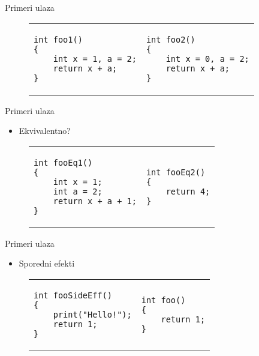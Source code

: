 \begin{frame}[fragile]{Primeri ulaza}
\begin{figure}[!h]
\centering
\begin{tabular}{ p{4.5cm} p{4.5cm} }
\begin{lstlisting}
int foo1()
{
    int x = 1, a = 2;
    return x + a;
}
\end{lstlisting}
&
\begin{lstlisting}
int foo2()
{
    int x = 0, a = 2;
    return x + a;
}
\end{lstlisting}
\end{tabular}
\end{figure}
\end{frame}


\begin{frame}[fragile]{Primeri ulaza}
    \begin{itemize}
        \item Ekvivalentno?
    \end{itemize}
\begin{figure}[!h]
\centering
\begin{tabular}{ p{4.5cm} p{4.5cm} }
\begin{lstlisting}
int fooEq1()
{
    int x = 1;
    int a = 2;
    return x + a + 1;
}
\end{lstlisting}
&
\begin{lstlisting}
int fooEq2()
{
    return 4;
}
\end{lstlisting}
\end{tabular}
\end{figure}
\end{frame}


\begin{frame}[fragile]{Primeri ulaza}
    \begin{itemize}
        \item Sporedni efekti
    \end{itemize}
\begin{figure}[!h]
\centering
\begin{tabular}{ p{4.5cm} p{4.5cm} }
\begin{lstlisting}
int fooSideEff()
{
    print("Hello!");
    return 1;
}
\end{lstlisting}
&
\begin{lstlisting}
int foo()
{
    return 1;
}
\end{lstlisting}
\end{tabular}
\end{figure}
\end{frame}

